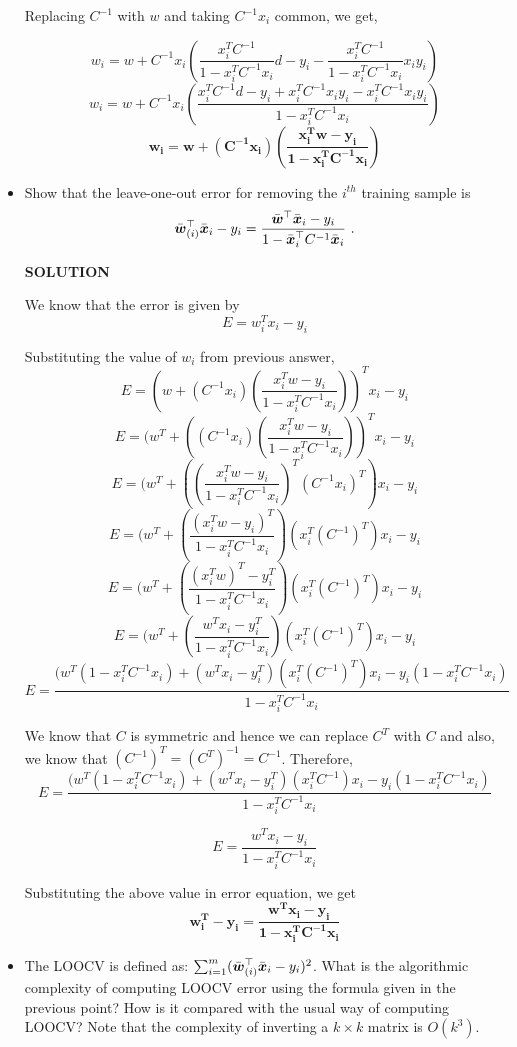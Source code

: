 \documentclass{article}
\begin{document}
\begin{itemize}
\begin{mdframed}[backgroundcolor=lightgray]
Replacing $C^{-1}$ with $w$ and taking $C^{-1}x_i$ common, we get,

\[
w_i = w + C^{-1}x_i(\frac{x_i^TC^{-1}}{1 - x_i^TC^{-1}x_i}d - y_i - \frac{x_i^TC^{-1}}{1 - x_i^TC^{-1}x_i}x_iy_i)
\]
\[
w_i = w + C^{-1}x_i(\frac{x_i^TC^{-1}d - y_i + x_i^TC^{-1}x_iy_i - x_i^TC^{-1}x_iy_i}{1 - x_i^TC^{-1}x_i})
\]
\[ \pmb{
w_i = w + (C^{-1}x_i)(\frac{x_i^Tw - y_i}{1 - x_i^TC^{-1}x_i})} \tag {*} \label{*}
\]
\end{mdframed}

\item Show that the leave-one-out error for removing the $i^{th}$ training sample is
\begin{align}
\bar{\boldsymbol{w}}_{(i)}^\top \bar{\boldsymbol{x}}_i - y_i = \frac{\bar{\boldsymbol{w}}^\top \bar{\boldsymbol{x}}_i - y_i}{ 1 - \bar{\boldsymbol{x}}_i^\top C^{-1} \bar{\boldsymbol{x}}_i}~.
\end{align} 

\textbf{SOLUTION}
\begin{mdframed}[backgroundcolor=lightgray]
We know that the error is given by
\[
E = w_i^Tx_i - y_i
\]

Substituting the value of $w_i$ from previous answer,
\[
E = (w + (C^{-1}x_i)(\frac{x_i^Tw - y_i}{1 - x_i^TC^{-1}x_i}))^Tx_i - y_i
\]
\[
E = (w^T + ((C^{-1}x_i)(\frac{x_i^Tw - y_i}{1 - x_i^TC^{-1}x_i}))^Tx_i - y_i
\]
\[
E = (w^T + ((\frac{x_i^Tw - y_i}{1 - x_i^TC^{-1}x_i})^T(C^{-1}x_i)^T)x_i - y_i
\]
\[
E = (w^T + (\frac{(x_i^Tw - y_i)^T}{1 - x_i^TC^{-1}x_i})(x_i^T(C^{-1})^T)x_i - y_i
\]
\[
E = (w^T + (\frac{(x_i^Tw)^T - y_i^T}{1 - x_i^TC^{-1}x_i})(x_i^T(C^{-1})^T)x_i - y_i
\]
\[
E = (w^T + (\frac{w^Tx_i - y_i^T}{1 - x_i^TC^{-1}x_i})(x_i^T(C^{-1})^T)x_i - y_i
\]
\[
E = \frac{(w^T(1 - x_i^TC^{-1}x_i) + (w^Tx_i - y_i^T)(x_i^T(C^{-1})^T)x_i - y_i(1 - x_i^TC^{-1}x_i)}{1 - x_i^TC^{-1}x_i}
\]

We know that $C$ is symmetric and hence we can replace $C^T$ with $C$ and also, we know that $(C^{-1})^T = (C^T)^{-1} = C^{-1}$. Therefore,
\[
E = \frac{(w^T(1 - x_i^TC^{-1}x_i) + (w^Tx_i - y_i^T)(x_i^TC^{-1})x_i - y_i(1 - x_i^TC^{-1}x_i)}{1 - x_i^TC^{-1}x_i}
\]

\[
E = \frac{w^Tx_i - y_i}{1 - x_i^TC^{-1}x_i} \label{*} \tag{*}
\]

Substituting the above value in error equation, we get
\[ \pmb{
w_i^T - y_i = \frac{w^Tx_i - y_i}{1 - x_i^TC^{-1}x_i}} \label{*} \tag{*}
\]
\end{mdframed}

\item The LOOCV is defined as: 
$\sum_{i=1}^{m}(\bar{\boldsymbol{w}}_{(i)}^\top\bar{\boldsymbol{x}}_i - y_i)^2$. What is the algorithmic complexity of computing LOOCV error using the formula given in the previous point? How is it compared with the usual way of computing LOOCV?
Note that the complexity of inverting a $k\times k$ matrix is $O(k^3)$.


\end{itemize}
\end{document}
